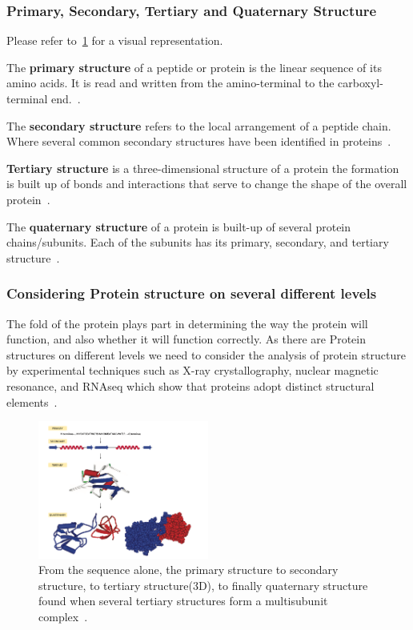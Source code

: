 \documentclass[]{final_report}
\begin{document}
\subsubsection{Primary, Secondary, Tertiary and Quaternary Structure}

Please refer to~\ref{fig:levels of protein structure.} for a visual representation.

The \textbf{primary structure} of a peptide or protein is the linear sequence of its amino acids. It is read and written from the amino-terminal to the carboxyl-terminal end.~\cite{sun_overview_2004}.

The \textbf{secondary structure} refers to the local arrangement of a peptide chain. Where several common secondary structures have been identified in proteins~\cite{sun_overview_2004}.

\textbf{Tertiary structure} is a three-dimensional structure of a protein the formation is built up of bonds and interactions that serve to change the shape of the overall protein~\cite{godbey_chapter_2022}.

The \textbf{quaternary structure} of a protein is built-up of several protein chains/subunits. Each of the subunits has its primary, secondary, and tertiary structure~\cite{ouellette_14_2015}.
\clearpage

\subsubsection{Considering Protein structure on several different levels}

The fold of the protein plays part in determining the way the protein will function, and also whether it will function correctly. As there are Protein structures on different levels we need to consider the analysis of protein structure by experimental techniques such as X-ray crystallography, nuclear magnetic resonance, and RNAseq which show that proteins adopt distinct structural elements~\cite{zvelebil_understanding_2008}.
\vspace{80px}


 
\begin{figure}[h]
    \centering
    \includegraphics[width=0.5\textwidth]{Protein Structure.png}
    \caption{\label{fig:levels of protein structure.}From the sequence alone, the primary structure to secondary structure, to tertiary structure(3D), to finally quaternary structure found when several tertiary structures form a multisubunit complex~\cite{zvelebil_understanding_2008}.}
\end{figure}
\clearpage
\end{document}
